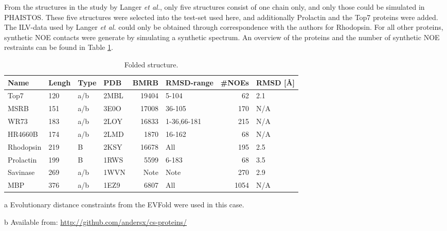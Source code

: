 From the structures in the study by Langer \textit{et al.}, only five structures consist of one chain only, and only those could be simulated in PHAISTOS.
These five structures were selected into the test-set used here, and additionally Prolactin and the Top7 proteins were added.
The ILV-data used by Langer \textit{et al.} could only be obtained through correspondence with the authors for Rhodopsin. 
For all other proteins, synthetic NOE contacts were generate by simulating a synthetic spectrum.
An overview of the proteins and the number of synthetic NOE restraints can be found in Table \ref{tab:folding_large}.




\begin{table}[h]
    \caption{Folded structure.}
    \begin{center}
    \begin{threeparttable}
    \begin{tabular}{l l l l r l r l}
Name                & Lengh    & Type   & PDB     & BMRB    & RMSD-range    & \#NOEs &  RMSD  [\AA]\\\hline
Top7                & 120      & a/b    & 2MBL    & 19404     & 5-104       &  62   & 2.1 \\
MSRB                & 151      & a/b    & 3E0O    & 17008     & 36-105      & 170   & N/A \\
WR73                & 183      & a/b    & 2LOY    & 16833     & 1-36,66-181 & 215   & N/A \\
HR4660B             & 174      & a/b    & 2LMD    & 1870      & 16-162      & 68    & N/A \\
Rhodopsin           & 219      & B      & 2KSY    & 16678     & All         & 195   & 2.5 \\
Prolactin           & 199      & B      & 1RWS    & 5599      & 6-183       & 68    & 3.5 \\
Savinase            & 269      & a/b    & 1WVN    & Note\tnote{a,b} & Note\tnote{b} & 270 & 2.9 \\
MBP                 & 376      & a/b    & 1EZ9    & 6807      & All         &  1054 & N/A
    \end{tabular}
    \begin{tablenotes}
    \item[a] Evolutionary distance constraints from the EVFold were used in this case.
    \item[b] Available from: \url{http://github.com/andersx/cs-proteins/}
    \end{tablenotes}
    \end{threeparttable}
    \end{center}
    \label{tab:folding_large}
\end{table}

